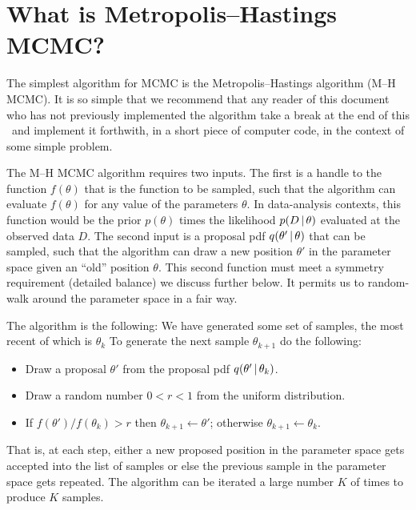 \documentclass[12pt,twoside,pdftex]{article}
\newcommand{\data}{D}
\newcommand{\pars}{\theta}
\begin{document}
\section{What is Metropolis--Hastings MCMC?}

The simplest algorithm for MCMC is the Metropolis--Hastings algorithm (M--H MCMC).
It is so simple that we recommend that any reader of this document
  who has not previously implemented the algorithm take a break at the end
  of this \sectionname\ and implement it forthwith, in a short piece of computer code,
  in the context of some simple problem.

The M--H MCMC algorithm requires two inputs.
The first is a handle to the function $f(\pars)$ that is the function to be sampled,
  such that the algorithm can evaluate $f(\pars)$ for any value of the parameters $\pars$.
In data-analysis contexts,
  this function would be the prior $p(\pars)$ times the likelihood $p(\data\given\pars)$
  evaluated at the observed data $\data$.
The second input is a proposal pdf $q(\pars'\given\pars)$ that can be sampled,
  such that the algorithm can draw a new position $\pars'$ in the parameter space
  given an ``old'' position $\pars$.
This second function must meet a symmetry requirement (detailed
  balance) we discuss further below.
It permits us to random-walk around the parameter space in a fair way.

The algorithm is the following:
We have generated some set of samples, the most recent of which is $\pars_k$
To generate the next sample $\pars_{k+1}$ do the following:
\begin{itemize}
\item Draw a proposal $\pars'$ from the proposal pdf $q(\pars'\given\pars_k)$.
\item Draw a random number $0<r<1$ from the uniform distribution.
\item If $f(\pars') / f(\pars_k) > r$ then $\pars_{k+1} \leftarrow \pars'$;
      otherwise $\pars_{k+1} \leftarrow \pars_k$.
\end{itemize}
That is, at each step, either a new proposed position in the parameter
  space gets accepted into the list of samples or else the previous sample
  in the parameter space gets repeated.
The algorithm can be iterated a large number $K$ of times to produce $K$ samples.
\end{document}
